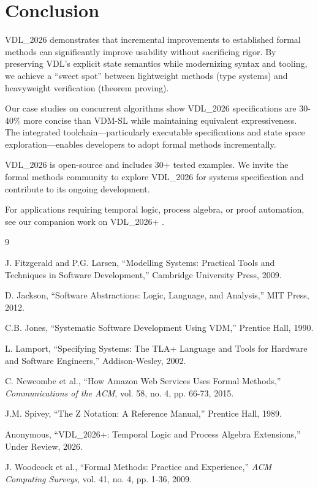 \documentclass[conference]{IEEEtran}
\begin{document}
\section{Conclusion}
\label{sec:conclusion}

VDL\_2026 demonstrates that incremental improvements to established formal methods can significantly improve usability without sacrificing rigor. By preserving VDL's explicit state semantics while modernizing syntax and tooling, we achieve a ``sweet spot'' between lightweight methods (type systems) and heavyweight verification (theorem proving).

Our case studies on concurrent algorithms show VDL\_2026 specifications are 30-40\% more concise than VDM-SL while maintaining equivalent expressiveness. The integrated toolchain---particularly executable specifications and state space exploration---enables developers to adopt formal methods incrementally.

VDL\_2026 is open-source and includes 30+ tested examples. We invite the formal methods community to explore VDL\_2026 for systems specification and contribute to its ongoing development.

For applications requiring temporal logic, process algebra, or proof automation, see our companion work on VDL\_2026+ \cite{vdl2026plus}.

\begin{thebibliography}{9}

J. Fitzgerald and P.G. Larsen, ``Modelling Systems: Practical Tools and Techniques in Software Development,'' Cambridge University Press, 2009.

D. Jackson, ``Software Abstractions: Logic, Language, and Analysis,'' MIT Press, 2012.

C.B. Jones, ``Systematic Software Development Using VDM,'' Prentice Hall, 1990.

L. Lamport, ``Specifying Systems: The TLA+ Language and Tools for Hardware and Software Engineers,'' Addison-Wesley, 2002.

C. Newcombe et al., ``How Amazon Web Services Uses Formal Methods,'' \textit{Communications of the ACM}, vol. 58, no. 4, pp. 66-73, 2015.

J.M. Spivey, ``The Z Notation: A Reference Manual,'' Prentice Hall, 1989.

Anonymous, ``VDL\_2026+: Temporal Logic and Process Algebra Extensions,'' Under Review, 2026.

J. Woodcock et al., ``Formal Methods: Practice and Experience,'' \textit{ACM Computing Surveys}, vol. 41, no. 4, pp. 1-36, 2009.

\end{thebibliography}
\end{document}
